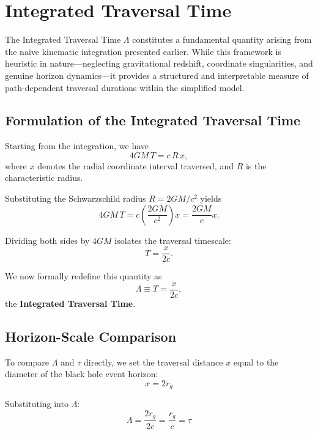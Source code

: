 \documentclass[12pt,a4paper]{article}
\begin{document}
\section{Integrated Traversal Time}

The Integrated Traversal Time $\Lambda$ constitutes a fundamental quantity arising from the naive kinematic integration presented earlier. While this framework is heuristic in nature—neglecting gravitational redshift, coordinate singularities, and genuine horizon dynamics—it provides a structured and interpretable measure of path-dependent traversal durations within the simplified model.

\subsection{Formulation of the Integrated Traversal Time}

Starting from the integration, we have
\begin{equation}
4GM \, T = c \, R \, x,
\end{equation}
where $x$ denotes the radial coordinate interval traversed, and $R$ is the characteristic radius.

Substituting the Schwarzschild radius $R = 2GM/c^2$ yields
\begin{equation}
4GM \, T = c \left(\frac{2GM}{c^2}\right) x = \frac{2GM}{c} x.
\end{equation}

Dividing both sides by $4GM$ isolates the traversal timescale:
\begin{equation}
T = \frac{x}{2c}.
\end{equation}

We now formally redefine this quantity as
\begin{equation}
\Lambda \equiv T = \frac{x}{2c},
\end{equation}
the \textbf{Integrated Traversal Time}.

\subsection{Horizon-Scale Comparison}

To compare $\Lambda$ and $\tau$ directly, we set the traversal distance $x$ equal to the diameter of the black hole event horizon:
\begin{equation}
x = 2r_g
\end{equation}

Substituting into $\Lambda$:
\begin{equation}
\Lambda = \frac{2r_g}{2c} = \frac{r_g}{c} = \tau
\end{equation}
\end{document}
